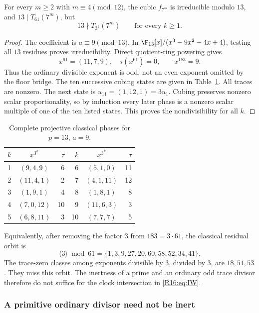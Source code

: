 \documentclass[11pt,a4paper]{article}
\theoremstyle{definition}\newtheorem{definition}[theorem]{Definition}
\theoremstyle{remark}\newtheorem{remark}[theorem]{Remark}
\begin{document}
\begin{proposition}\label{R16:prop:13miss}
For every $m\ge2$ with $m\equiv4\pmod{12}$, the cubic $f_{7^m}$ is irreducible
modulo $13$, and $13\mid T_{61}(7^m)$, but
\[
 13\nmid T_{3^k}(7^m)\qquad\text{for every }k\ge1.
\]
\end{proposition}
\begin{proof}
The coefficient is $a\equiv9\pmod{13}$. In
$\F_{13}[x]/(x^3-9x^2-4x+4)$, testing all $13$ residues proves
irreducibility. Direct quotient-ring powering gives
\[
 x^{61}=(11,7,9),\quad\tau(x^{61})=0,\qquad x^{183}=9.
\]
Thus the ordinary divisible exponent is odd, not an even exponent omitted
by the floor bridge. The ten successive cubing states are given in
Table~\ref{R16:tab:13miss}. All traces are nonzero. The next state is
$u_{11}=(1,12,1)=3u_1$. Cubing preserves nonzero scalar proportionality,
so by induction every later phase is a nonzero scalar multiple of one
of the ten listed states. This proves the nondivisibility for all $k$.
\end{proof}

\begin{table}[ht]
\centering\small
\begin{tabular}{rcr@{\qquad}rcr}
\toprule
$k$&$x^{3^k}$&$\tau$&$k$&$x^{3^k}$&$\tau$\\
\midrule
1&$(9,4,9)$&6&6&$(5,1,0)$&11\\
2&$(11,4,1)$&2&7&$(4,1,11)$&12\\
3&$(1,9,1)$&4&8&$(1,8,1)$&8\\
4&$(7,0,12)$&10&9&$(11,6,3)$&3\\
5&$(6,8,11)$&3&10&$(7,7,7)$&5\\
\bottomrule
\end{tabular}
\caption{Complete projective classical phases for $p=13$, $a=9$.}
\label{R16:tab:13miss}
\end{table}

Equivalently, after removing the factor $3$ from $183=3\cdot61$, the
classical residual orbit is
\[
 \langle3\rangle\bmod61=\{1,3,9,27,20,60,58,52,34,41\}.
\]
The trace-zero classes among exponents divisible by $3$, divided by $3$,
are $18,51,53$. They miss this orbit. The inertness of a prime and an
ordinary odd trace divisor therefore do not suffice for the clock
intersection in \eqref{R16:eq:IW}.

\subsubsection{A primitive ordinary divisor need not be inert}
\end{document}

